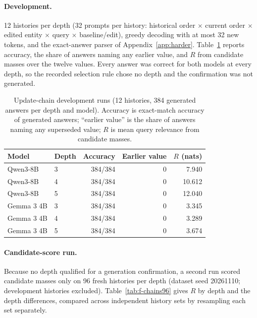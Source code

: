 \paragraph{Development.} 12 histories per depth (32 prompts per history: historical order $\times$ current order $\times$ edited entity $\times$ query $\times$ baseline/edit), greedy decoding with at most 32 new tokens, and the exact-answer parser of Appendix~\ref{app:harder}. Table~\ref{tab:f-chains} reports accuracy, the share of answers naming any earlier value, and $R$ from candidate masses over the twelve values. Every answer was correct for both models at every depth, so the recorded selection rule chose no depth and the confirmation was not generated.

\begin{table}[h]
\caption{Update-chain development runs (12 histories, 384 generated answers per depth and model). Accuracy is exact-match accuracy of generated answers; ``earlier value'' is the share of answers naming any superseded value; $R$ is mean query relevance from candidate masses.}
\label{tab:f-chains}
\begin{center}
\small
\begin{tabular}{@{}llrrr@{}}
\toprule
Model & Depth & Accuracy & Earlier value & $R$ (nats) \\
\midrule
Qwen3-8B & 3 & 384/384 & 0 & 7.940 \\
Qwen3-8B & 4 & 384/384 & 0 & 10.612 \\
Qwen3-8B & 5 & 384/384 & 0 & 12.040 \\
\midrule
Gemma 3 4B & 3 & 384/384 & 0 & 3.345 \\
Gemma 3 4B & 4 & 384/384 & 0 & 3.289 \\
Gemma 3 4B & 5 & 384/384 & 0 & 3.674 \\
\bottomrule
\end{tabular}
\end{center}
\end{table}

\paragraph{Candidate-score run.} Because no depth qualified for a generation confirmation, a second run scored candidate masses only on 96 fresh histories per depth (dataset seed 20261110; development histories excluded). Table~\ref{tab:f-chains96} gives $R$ by depth and the depth differences, compared across independent history sets by resampling each set separately.

